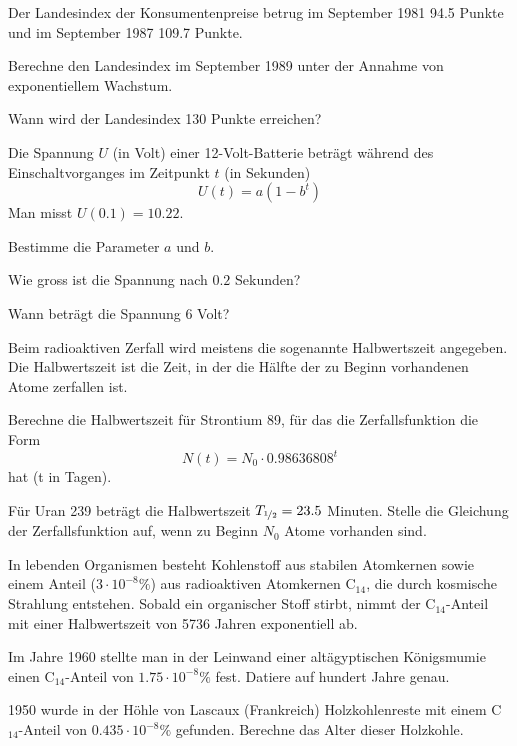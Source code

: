 \documentclass[%
11pt,%
twoside,%
titlepage,%
german,%
headsepline%
]{scrartcl}
\begin{document}
\begin{ueb}[Konsum]
Der Landesindex der Konsumentenpreise betrug im September 1981 94.5 Punkte und im September 1987 109.7 Punkte.
\begin{enumeratea}
\item Berechne den Landesindex im September 1989
unter der Annahme von exponentiellem Wachstum.
\item Wann wird der Landesindex 130 Punkte erreichen?
\end{enumeratea}
\end{ueb}

\begin{ueb}[Spannung]
Die Spannung $U$ (in Volt) einer 12-Volt-Batterie
beträgt während des Einschaltvorganges im Zeitpunkt $t$ (in Sekunden)
$$U(t) = a(1 - b^t)$$
Man misst $U(0.1) = 10.22$.
\begin{enumeratea}
\item Bestimme die Parameter $a$ und $b$.
\item Wie gross ist die Spannung nach $0.2$ Sekunden?
\item Wann beträgt die Spannung 6 Volt?
\end{enumeratea}
\end{ueb}

\begin{ueb}[Zerfall]
Beim radioaktiven Zerfall wird meistens die sogenannte Halbwertszeit angegeben. Die Halbwertszeit ist die Zeit, in der die Hälfte der zu Beginn vorhandenen Atome zerfallen ist.
\begin{enumeratea}
\item Berechne die Halbwertszeit für Strontium 89, für das die Zerfallsfunktion die Form
$$N(t)=N_0\cdot0.98636808^t$$
hat (t in Tagen).
\item Für Uran 239 beträgt die Halbwertszeit $T_{\nicefrac{1}{2}}=23.5$
Minuten. Stelle die Gleichung der Zerfallsfunktion auf, wenn zu Beginn $N_0$ Atome vorhanden sind.
\end{enumeratea}
\end{ueb}

\begin{ueb}[Altersbestimmung]
In lebenden Organismen besteht Kohlenstoff aus stabilen Atomkernen sowie einem Anteil ($3\cdot10^{-8}\%$) aus radioaktiven Atomkernen C$_{14}$, die durch kosmische Strahlung entstehen. Sobald ein organischer Stoff stirbt, nimmt der C$_{14}$-Anteil mit einer Halbwertszeit von 5736 Jahren exponentiell ab.
\begin{enumeratea}
\item Im Jahre 1960 stellte man in der Leinwand einer altägyptischen Königsmumie einen C$_{14}$-Anteil von $1.75\cdot10^{-8}\%$ fest. Datiere auf hundert Jahre genau.
\item 1950 wurde in der Höhle von Lascaux (Frankreich) Holzkohlenreste mit einem C$_{14}$-Anteil von $0.435\cdot10^{-8}\%$ gefunden. Berechne das Alter dieser Holzkohle.
\end{enumeratea}
\end{ueb}
\end{document}
